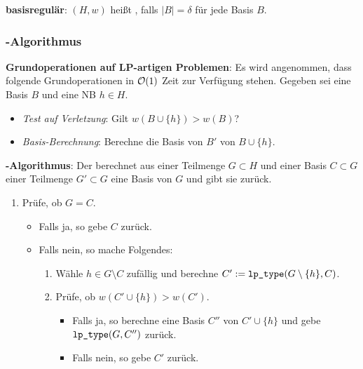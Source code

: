 \textbf{basisregulär}:
$(H, w)$ heißt , falls $|B| = \delta$ für jede Basis $B$.

\subsubsection{%
    -Algorithmus%
}

\textbf{Grundoperationen auf LP-artigen Problemen}:
Es wird angenommen, dass folgende Grundoperationen in $\mathcal{O}(1)$ Zeit zur Verfügung stehen.
Gegeben sei eine Basis $B$ und eine NB $h \in H$.
\begin{itemize}
    \item
    \emph{Test auf Verletzung}:
    Gilt $w(B \cup \{h\}) > w(B)$?
    
    \item
    \emph{Basis-Berechnung}:
    Berechne die Basis von $B'$ von $B \cup \{h\}$.
\end{itemize}

\textbf{-Algorithmus}:
Der  berechnet aus einer Teilmenge $G \subset H$ und
einer Basis $C \subset G$ einer Teilmenge $G' \subset G$ eine Basis von $G$ und gibt sie zurück.
\begin{enumerate}
    \item
    Prüfe, ob $G = C$.
    \begin{itemize}
        \item
        Falls ja, so gebe $C$ zurück.
        
        \item
        Falls nein, so mache Folgendes:
        \begin{enumerate}
            \item
            Wähle $h \in G \setminus C$ zufällig und
            berechne $C' := \texttt{lp\_type}(G \setminus \{h\}, C)$.
            
            \item
            Prüfe, ob $w(C' \cup \{h\}) > w(C')$.
            \begin{itemize}
                \item
                Falls ja, so berechne eine Basis $C''$ von $C' \cup \{h\}$
                und gebe $\texttt{lp\_type}(G, C'')$ zurück.
                
                \item
                Falls nein, so gebe $C'$ zurück.
            \end{itemize}
        \end{enumerate}
    \end{itemize}
\end{enumerate}

